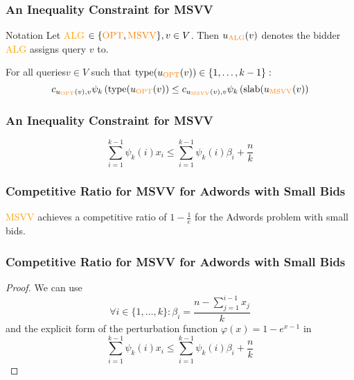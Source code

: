\begin{frame}
    \frametitle{An Inequality Constraint for MSVV}
    \begin{block}{Notation}
        Let \textcolor{orange}{ALG} $\in \{\text{\textcolor{orange}{OPT}}, \text{\textcolor{orange}{MSVV}} \}, v \in V$. Then $u_{\text{\textcolor{orange}{ALG}}}(v)$ denotes the bidder \textcolor{orange}{ALG} assigns query $v$ to.
    \end{block}
    \begin{lemma}
        For all queries$v \in V$ such that $\text{type}(u_{\text{\textcolor{orange}{OPT}}}(v)) \in \{1, \dots, k-1 \}:$
        \begin{equation*}
            c_{u_{\text{\textcolor{orange}{OPT}}}(v),v} \psi_k \left(\text{type}(u_{\text{\textcolor{orange}{OPT}}}(v) \right) \leq c_{u_{\text{\textcolor{orange}{MSVV}}}(v),v} \psi_k \left(\text{slab}(u_{\text{\textcolor{orange}{MSVV}}}(v) \right)
        \end{equation*}
    \end{lemma}
\end{frame}

\begin{frame}
    \frametitle{An Inequality Constraint for MSVV}
    \begin{lemma}
        \begin{equation*}
            \sum_{i=1}^{k-1} \psi_k(i) x_i \leq \sum_{i=1}^{k-1} \psi_k(i) \beta_i + \frac{n}{k}
        \end{equation*}
    \end{lemma}
\end{frame}

\begin{frame}
    \frametitle{Competitive Ratio for MSVV for Adwords with Small Bids}
    \begin{theorem}
        \textcolor{orange}{MSVV} achieves a competitive ratio of $1 - \frac{1}{e}$ for the Adwords problem with small bids.
    \end{theorem}
\end{frame}

\begin{frame}
    \frametitle{Competitive Ratio for MSVV for Adwords with Small Bids}
    \begin{proof}
        \let\qed\relax
        We can use
        \begin{equation*}
            \forall i \in \{1, \dots, k \}: \beta_i = \frac{n - \sum_{j=1}^{i-1} x_j}{k}
        \end{equation*}
        and the explicit form of the perturbation function $\varphi(x) = 1 - e^{x-1}$ in
        \begin{equation*}
            \sum_{i=1}^{k-1} \psi_k(i) x_i \leq \sum_{i=1}^{k-1} \psi_k(i) \beta_i + \frac{n}{k}
        \end{equation*}
    \end{proof}
\end{frame}

